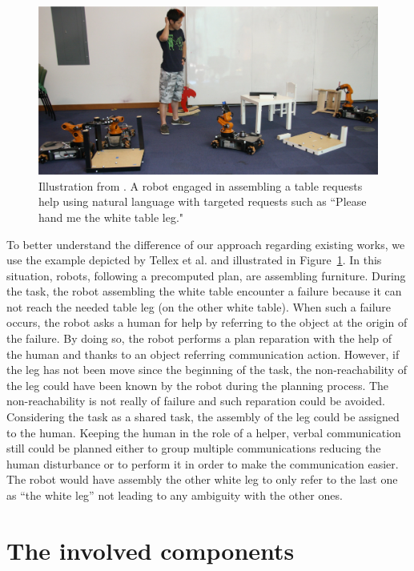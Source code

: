 \begin{figure}[!ht]
\centering
\includegraphics[scale=0.25]{figures/chapter5/tellex.png}
\caption{\label{fig:chap5_tellex} Illustration from \cite{tellex_2014_asking}.
A robot engaged in assembling a table requests help using natural language with targeted requests such as “Please hand me the white table leg." }
\end{figure}

To better understand the difference of our approach regarding existing works, we use the example depicted by Tellex et al. \cite{tellex_2014_asking} and illustrated in Figure~\ref{fig:chap5_tellex}. In this situation, robots, following a precomputed plan, are assembling furniture. During the task, the robot assembling the white table encounter a failure because it can not reach the needed table leg (on the other white table). When such a failure occurs, the robot asks a human for help by referring to the object at the origin of the failure. By doing so, the robot performs a plan reparation with the help of the human and thanks to an object referring communication action. However, if the leg has not been move since the beginning of the task, the non-reachability of the leg could have been known by the robot during the planning process. The non-reachability is not really of failure and such reparation could be avoided. Considering the task as a shared task, the assembly of the leg could be assigned to the human. Keeping the human in the role of a helper, verbal communication still could be planned either to group multiple communications reducing the human disturbance or to perform it in order to make the communication easier. The robot would have assembly the other white leg to only refer to the last one as ``the white leg'' not leading to any ambiguity with the other ones.


\section{The involved components}

